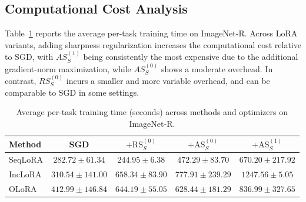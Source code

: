 \documentclass{article}
\theoremstyle{plain}
\theoremstyle{definition}
\theoremstyle{remark}
\begin{document}
\subsection{Computational Cost Analysis}


Table~\ref{tab:lora_opt_metric} reports the average per-task training time on ImageNet-R.
Across LoRA variants, adding sharpness regularization increases the computational cost relative to SGD, with $AS^{(1)}_S$ being consistently the most expensive due to the additional gradient-norm maximization, while $AS^{(0)}_S$ shows a moderate overhead.
In contrast, $RS^{(0)}_S$ incurs a smaller and more variable overhead, and can be comparable to SGD in some settings.


\begin{table}[hpb]
\centering
\caption{Average per-task training time (seconds) across methods and optimizers on ImageNet-R.}
\label{tab:lora_opt_metric}
\footnotesize
\setlength{\tabcolsep}{3pt}
\renewcommand{\arraystretch}{0.95}
\begin{tabular}{l cccc}
\toprule
\textbf{Method} & \textbf{SGD} & $+\mathrm{RS}^{(0)}_S$ & $+\mathrm{AS}^{(0)}_S$ & $+\mathrm{AS}^{(1)}_S$ \\
\midrule
SeqLoRA & $282.72 \pm 61.34$  & $244.95 \pm 6.38$  & $472.29 \pm 83.70$  & $670.20 \pm 217.92$ \\
IncLoRA & $310.54 \pm 141.00$ & $658.34 \pm 83.90$ & $777.91 \pm 239.29$ & $1247.56 \pm 5.05$ \\
OLoRA   & $412.99 \pm 146.84$ & $644.19 \pm 55.05$ & $628.44 \pm 181.29$ & $836.99 \pm 327.65$ \\
\bottomrule
\end{tabular}
\end{table}

\end{document}
